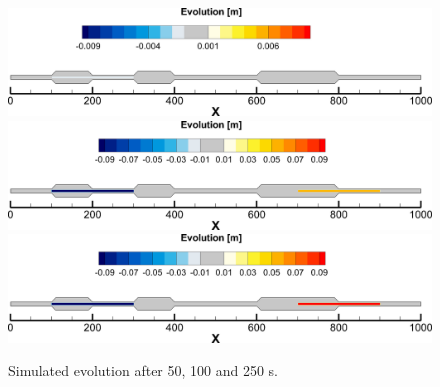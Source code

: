\begin{figure} [!h]
\centering
\includegraphics[scale=0.15]{../img/result50.png}
\includegraphics[scale=0.15]{../img/result150.png}
\includegraphics[scale=0.15]{../img/result250.png}
 \caption{Simulated evolution after 50, 100 and 250 s.}\label{result50}
\end{figure}


